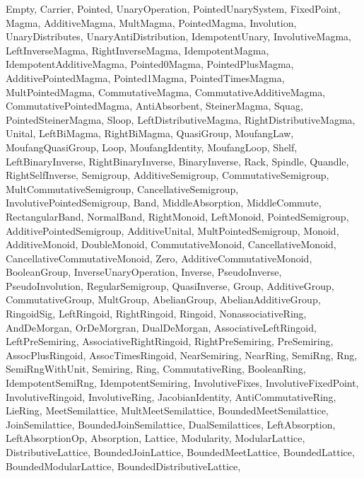 \parbox{\linewidth}{
\begin{tiny}
Empty, Carrier, Pointed, UnaryOperation, PointedUnarySystem, FixedPoint, Magma, 
AdditiveMagma, MultMagma, PointedMagma, Involution, UnaryDistributes, UnaryAntiDistribution, IdempotentUnary, InvolutiveMagma, LeftInverseMagma, RightInverseMagma, IdempotentMagma, IdempotentAdditiveMagma, Pointed0Magma, PointedPlusMagma, AdditivePointedMagma, Pointed1Magma, PointedTimesMagma, MultPointedMagma, CommutativeMagma, CommutativeAdditiveMagma, CommutativePointedMagma, AntiAbsorbent, SteinerMagma, Squag, PointedSteinerMagma, Sloop, LeftDistributiveMagma, RightDistributiveMagma, Unital, LeftBiMagma, RightBiMagma, QuasiGroup,
MoufangLaw, MoufangQuasiGroup, Loop, MoufangIdentity, MoufangLoop, Shelf, LeftBinaryInverse, RightBinaryInverse, BinaryInverse, Rack, Spindle, Quandle, RightSelfInverse, Semigroup, AdditiveSemigroup, CommutativeSemigroup, MultCommutativeSemigroup, CancellativeSemigroup, InvolutivePointedSemigroup, Band, MiddleAbsorption, MiddleCommute, RectangularBand, NormalBand, RightMonoid, LeftMonoid, PointedSemigroup, AdditivePointedSemigroup, AdditiveUnital, MultPointedSemigroup, Monoid, AdditiveMonoid, DoubleMonoid, CommutativeMonoid, CancellativeMonoid, CancellativeCommutativeMonoid, Zero, AdditiveCommutativeMonoid, BooleanGroup, InverseUnaryOperation, Inverse, PseudoInverse, PseudoInvolution, RegularSemigroup, QuasiInverse, Group, AdditiveGroup, CommutativeGroup, MultGroup, AbelianGroup, AbelianAdditiveGroup, RingoidSig, LeftRingoid, RightRingoid, Ringoid, NonassociativeRing, AndDeMorgan, OrDeMorgran, DualDeMorgan, AssociativeLeftRingoid, LeftPreSemiring, AssociativeRightRingoid, RightPreSemiring, PreSemiring, AssocPlusRingoid, AssocTimesRingoid, NearSemiring, NearRing, SemiRng, Rng, SemiRngWithUnit, Semiring, Ring, CommutativeRing, BooleanRing, IdempotentSemiRng, IdempotentSemiring, InvolutiveFixes, InvolutiveFixedPoint, InvolutiveRingoid, InvolutiveRing, JacobianIdentity, AntiCommutativeRing, LieRing, MeetSemilattice, MultMeetSemilattice, BoundedMeetSemilattice, JoinSemilattice, BoundedJoinSemilattice, DualSemilattices, LeftAbsorption, LeftAbsorptionOp, Absorption, Lattice, Modularity, ModularLattice, DistributiveLattice, BoundedJoinLattice, BoundedMeetLattice, BoundedLattice, BoundedModularLattice, BoundedDistributiveLattice,
\end{tiny}}
